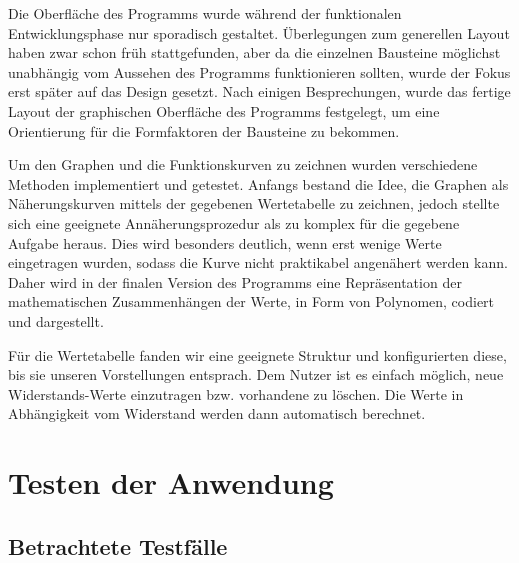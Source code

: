 \documentclass[a4paper]{article}
\begin{document}
    Die Oberfläche des Programms wurde während der funktionalen Entwicklungsphase nur sporadisch gestaltet.
    Überlegungen zum generellen Layout haben zwar schon früh stattgefunden, aber da die einzelnen Bausteine möglichst unabhängig vom Aussehen des Programms funktionieren sollten, wurde der Fokus erst später auf das Design gesetzt.
    Nach einigen Besprechungen, wurde das fertige Layout der graphischen Oberfläche des Programms festgelegt, um eine Orientierung für die Formfaktoren der Bausteine zu bekommen.

    Um den Graphen und die Funktionskurven zu zeichnen wurden verschiedene Methoden implementiert und getestet.
    Anfangs bestand die Idee, die Graphen als Näherungskurven mittels der gegebenen Wertetabelle zu zeichnen, jedoch stellte sich eine geeignete Annäherungsprozedur als zu komplex für die gegebene Aufgabe heraus.
    Dies wird besonders deutlich, wenn erst wenige Werte eingetragen wurden, sodass die Kurve nicht praktikabel angenähert werden kann.
    Daher wird in der finalen Version des Programms eine Repräsentation der mathematischen Zusammenhängen der Werte, in Form von Polynomen, codiert und dargestellt.

    Für die Wertetabelle fanden wir eine geeignete Struktur und konfigurierten diese, bis sie unseren Vorstellungen entsprach.
    Dem Nutzer ist es einfach möglich, neue Widerstands-Werte einzutragen bzw. vorhandene zu löschen.
    Die Werte in Abhängigkeit vom Widerstand werden dann automatisch berechnet.

\newpage
\section{Testen der Anwendung}

\subsection{Betrachtete Testfälle}
\end{document}
